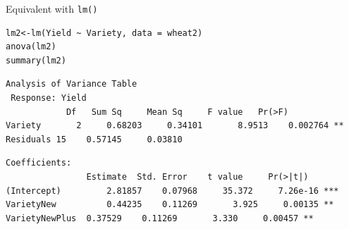 \documentclass{beamer}
\makeatletter
\newenvironment{kframe}{%
 \def\at@end@of@kframe{}%
 \ifinner\ifhmode%
  \def\at@end@of@kframe{\end{minipage}}%
  \begin{minipage}{\columnwidth}%
 \fi\fi%
 \def\FrameCommand##1{\hskip\@totalleftmargin \hskip-\fboxsep
 \colorbox{shadecolor}{##1}\hskip-\fboxsep
     \hskip-\linewidth \hskip-\@totalleftmargin \hskip\columnwidth}%
 \MakeFramed {\advance\hsize-\width
   \@totalleftmargin\z@ \linewidth\hsize
   \@setminipage}}%
 {\par\unskip\endMakeFramed%
 \at@end@of@kframe}
\newenvironment{knitrout}{}{} %
\makeatother
\begin{document}
\begin{frame}[fragile]{Equivalent with \texttt{lm()}}
    \begin{knitrout}
\color{fgcolor}\begin{kframe}
\footnotesize
\begin{verbatim}
lm2<-lm(Yield ~ Variety, data = wheat2) 
anova(lm2)
summary(lm2)
\end{verbatim}
\end{kframe}
\end{knitrout}
 
   \begin{knitrout}
\color{fgcolor}\begin{kframe}
\footnotesize
\begin{verbatim}
Analysis of Variance Table
 Response: Yield
          	Df 	 Sum Sq 	Mean Sq     F value   Pr(>F)   
Variety       2 	0.68203   	0.34101       8.9513    0.002764 **
Residuals 15 	0.57145  	0.03810 
\end{verbatim}
\end{kframe}
\end{knitrout}

 
   \begin{knitrout}
\color{fgcolor}\begin{kframe}
\footnotesize
\begin{verbatim}
Coefficients:
               	Estimate  Std. Error    t value     Pr(>|t|)    
(Intercept)     	2.81857    0.07968     35.372     7.26e-16 ***
VarietyNew      	0.44235    0.11269       3.925     0.00135 ** 
VarietyNewPlus 	0.37529    0.11269       3.330     0.00457 ** 
\end{verbatim}
\end{kframe}
\end{knitrout}

\end{frame}
\end{document}
